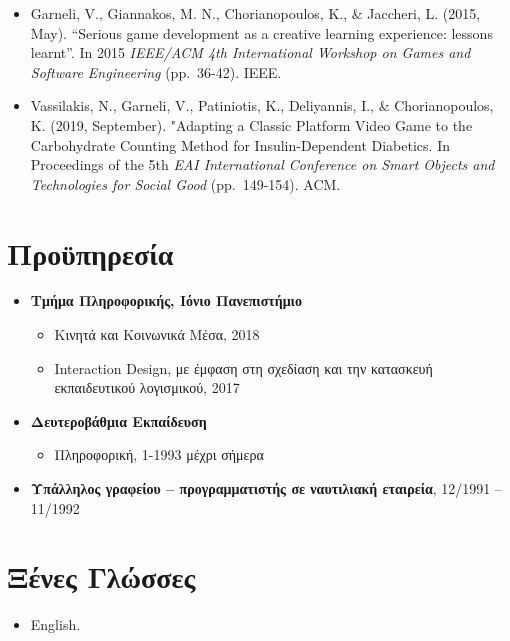 \documentclass[%
    11pt,
  oneside
  ]{memoir}
\let\oldsection\section
\renewcommand{\section}[1]{%
  \oldsection{#1}
  \leavevmode
  \par
  \vspace{\dimexpr-\baselineskip-\parskip}
}
\begin{document}
\begin{itemize}
\item
  Garneli, V., Giannakos, M. N., Chorianopoulos, K., \& Jaccheri, L.
  (2015, May). ``Serious game development as a creative learning
  experience: lessons learnt''. In 2015 \emph{IEEE/ACM 4th International
  Workshop on Games and Software Engineering} (pp.~36-42). IEEE.
\item
  Vassilakis, N., Garneli, V., Patiniotis, K., Deliyannis, I., \&
  Chorianopoulos, K. (2019, September). "Adapting a Classic Platform
  Video Game to the Carbohydrate Counting Method for Insulin-Dependent
  Diabetics. In Proceedings of the 5th \emph{EAI International
  Conference on Smart Objects and Technologies for Social Good}
  (pp.~149-154). ACM.
\end{itemize}

\hypertarget{ux3c0ux3c1ux3bfux3cbux3c0ux3b7ux3c1ux3b5ux3c3ux3afux3b1}{%
\section{Προϋπηρεσία}\label{ux3c0ux3c1ux3bfux3cbux3c0ux3b7ux3c1ux3b5ux3c3ux3afux3b1}}

\begin{itemize}
\tightlist
\item
  \textbf{Τμήμα Πληροφορικής, Ιόνιο Πανεπιστήμιο}

  \begin{itemize}
  \tightlist
  \item
    Κινητά και Κοινωνικά Μέσα, 2018
  \item
    Interaction Design, με έμφαση στη σχεδίαση και την κατασκευή
    εκπαιδευτικού λογισμικού, 2017
  \end{itemize}
\item
  \textbf{Δευτεροβάθμια Εκπαίδευση}

  \begin{itemize}
  \tightlist
  \item
    Πληροφορική, 1-1993 μέχρι σήμερα
  \end{itemize}
\item
  \textbf{Υπάλληλος γραφείου -- προγραμματιστής σε ναυτιλιακή εταιρεία},
  12/1991 -- 11/1992
\end{itemize}

\hypertarget{ux3beux3adux3bdux3b5ux3c2-ux3b3ux3bbux3ceux3c3ux3c3ux3b5ux3c2}{%
\section{Ξένες
Γλώσσες}\label{ux3beux3adux3bdux3b5ux3c2-ux3b3ux3bbux3ceux3c3ux3c3ux3b5ux3c2}}

\begin{itemize}
\tightlist
\item
  English.
\end{itemize}
\end{document}
